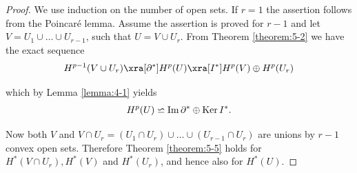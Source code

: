 \begin{proof}
  We use induction on the number of open sets. If $r = 1$ the assertion
follows from the Poincar\'e lemma. Assume the assertion is proved for $r - 1$ and
let $V = U_1\cup\ldots\cup U_{r-1}$, such that $U = V\cup U_r$. From Theorem \ref{theorem:5-2} we have 
the exact sequence
\begin{align*}
  H^{p-1}(V\cup U_r) \xra[\partial^*] H^p(U) \xra[I^*] H^p(V)\oplus H^p(U_r)
\end{align*}

which by Lemma \ref{lemma:4-1} yields
\begin{align*}
  H^p(U) \backsimeq \operatorname{Im}\partial^* \oplus \operatorname{Ker} I^*.
\end{align*}

Now both $V$ and $V\cap U_r = (U_1\cap U_r)\cup\ldots\cup (U_{r-1}\cap U_r)$ are unions by $r-1$ convex open sets.
Therefore Theorem \ref{theorem:5-5} holds for $H^*(V\cap U_r), H^*(V)$ and $H^*(U_r)$, and hence also for $H^*(U)$.
\end{proof}

